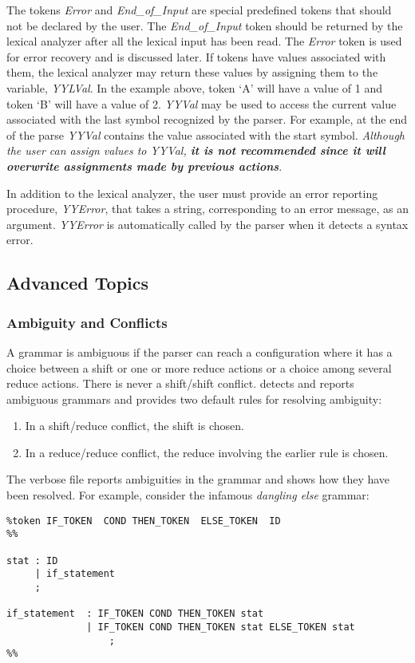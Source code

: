 The tokens {\it Error} and {\it End\_of\_Input} are special predefined tokens
that should not be declared by the user.  The {\it End\_of\_Input} token
should be returned by the lexical analyzer after all the lexical
input has been read.  The {\it Error} token is used for error recovery
and is discussed later.  If tokens have values associated with them,
the lexical analyzer may return these values by assigning them to the
variable,
{\it YYLVal}.
In the example above, token `A' will have a value of 1
and token `B' will have a value of 2.
{\it YYVal}
may be used to
access the current value associated with the last symbol recognized
by the parser.  For example, at the end of the parse
{\it YYVal}
contains the value associated with the start symbol.  {\it Although the
user can assign values to YYVal,
{\bf it is not recommended since it will overwrite assignments
made by previous actions}}.

\newpage
In addition to the lexical analyzer, the user must provide an
error reporting procedure,
{\it YYError},
that takes a string, corresponding to an error message, as an argument.
{\it YYError}
is automatically called by the parser when it detects a syntax error.

\subsection{Advanced Topics}
\subsubsection{Ambiguity and Conflicts}

A grammar is ambiguous if the parser can reach a configuration where
it has a choice between a shift or one or more reduce actions or
a choice among several reduce actions.  There is never a shift/shift
conflict.  \ayacc detects and reports ambiguous grammars and provides two
default rules for resolving ambiguity:

\begin{enumerate}

\item In a shift/reduce conflict, the shift is chosen.
\item In a reduce/reduce conflict, the reduce involving the earlier rule
is chosen.
\end{enumerate}

The verbose file reports ambiguities in the grammar and shows how they have
been resolved.  For example, consider the infamous {\it dangling else} grammar:
\newpage
\begin{verbatim}
%token IF_TOKEN  COND THEN_TOKEN  ELSE_TOKEN  ID
%%

stat : ID
     | if_statement
     ;

if_statement  : IF_TOKEN COND THEN_TOKEN stat
              | IF_TOKEN COND THEN_TOKEN stat ELSE_TOKEN stat
                  ;
%%
\end{verbatim}

